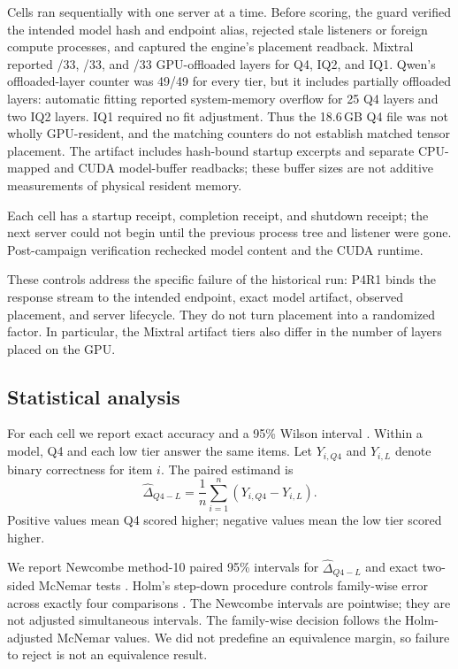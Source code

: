 \documentclass[11pt]{article}
\begin{document}
Cells ran sequentially with one server at a time. Before scoring, the guard
verified the intended model hash and endpoint alias, rejected stale listeners
or foreign compute processes, and captured the engine's placement readback.
Mixtral reported \PfourMixtralHealthyGpuLayers/33,
\PfourMixtralIqTwoGpuLayers/33, and
\PfourMixtralIqOneGpuLayers/33 GPU-offloaded layers for Q4, IQ2, and IQ1.
Qwen's offloaded-layer counter was 49/49 for every tier, but it includes
partially offloaded layers: automatic fitting reported system-memory overflow
for 25 Q4 layers and two IQ2 layers. IQ1 required no fit adjustment. Thus the
18.6\,GB Q4 file was not wholly GPU-resident, and the matching counters do not
establish matched tensor placement. The artifact includes hash-bound startup
excerpts and separate CPU-mapped and CUDA model-buffer readbacks; these buffer
sizes are not additive measurements of physical resident memory.

Each cell has a startup receipt, completion receipt, and shutdown receipt; the next
server could not begin until the previous process tree and listener were gone.
Post-campaign verification rechecked model content and the CUDA runtime.

These controls address the specific failure of the historical run: P4R1 binds
the response stream to the intended endpoint, exact model artifact, observed
placement, and server lifecycle. They do not turn placement into a randomized
factor. In particular, the Mixtral artifact tiers also differ in the number of
layers placed on the GPU.

\subsection{Statistical analysis}

For each cell we report exact accuracy and a 95\% Wilson interval
\citep{wilson1927}. Within a model, Q4 and each low tier answer the same
items. Let $Y_{i,Q4}$ and $Y_{i,L}$ denote binary correctness for item $i$.
The paired estimand is
\begin{equation}
  \widehat{\Delta}_{Q4-L}
  = \frac{1}{n}\sum_{i=1}^{n}(Y_{i,Q4}-Y_{i,L}).
\end{equation}
Positive values mean Q4 scored higher; negative values mean the low tier
scored higher.

We report Newcombe method-10 paired 95\% intervals for
$\widehat{\Delta}_{Q4-L}$ and exact two-sided McNemar tests
\citep{newcombe1998paired,mcnemar1947}. Holm's step-down procedure controls
family-wise error across exactly four comparisons
\citep{holm1979}. The Newcombe intervals are pointwise; they are not adjusted
simultaneous intervals. The family-wise decision follows the Holm-adjusted
McNemar values. We did not predefine an equivalence margin, so failure to
reject is not an equivalence result.
\end{document}
